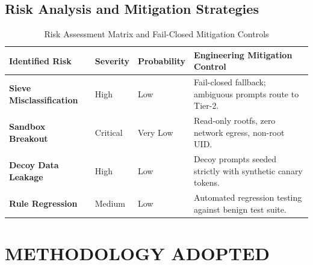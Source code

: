 \documentclass[12pt,a4paper,oneside]{report}
\begin{document}
\section{Risk Analysis and Mitigation Strategies}
\begin{table}[H]
\small
\renewcommand{\arraystretch}{1.2}
\begin{tabularx}{\textwidth}{@{}p{1.3in} p{0.8in} p{0.8in} X@{}}
\rowcolor{HeaderGray} \textbf{Identified Risk} & \textbf{Severity} & \textbf{Probability} & \textbf{Engineering Mitigation Control} \\
\hline
\textbf{Sieve Misclassification} & High & Low & Fail-closed fallback; ambiguous prompts route to Tier-2. \\
\textbf{Sandbox Breakout} & Critical & Very Low & Read-only rootfs, zero network egress, non-root UID. \\
\textbf{Decoy Data Leakage} & High & Low & Decoy prompts seeded strictly with synthetic canary tokens. \\
\textbf{Rule Regression} & Medium & Low & Automated regression testing against benign test suite. \\
\hline
\end{tabularx}
\caption{Risk Assessment Matrix and Fail-Closed Mitigation Controls}
\end{table}

\chapter{METHODOLOGY ADOPTED}
\end{document}
